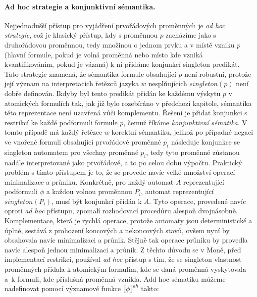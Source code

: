 \paragraph{Ad hoc strategie a konjunktivní sémantika.} Nejjednodušší přístup pro vyjádření prvořádových proměnných je \textit{ad hoc strategie}, což je klasický přístup, kdy s proměnnou $p$ zacházíme jako s druhořádovou proměnnou, tedy množinou o jednom prvku a v místě vzniku $p$ (hlavní formule, pokud je volná proměnná nebo místo kde vzniká kvantifikováním, pokud je vázaná) k ní přidáme konjunkcí singleton predikát. Tato strategie znamená, že sémantika formule obsahující $p$ není robustní, protože její význam na interpretacích řetězců jazyka $w$ nesplňujících $singleton(p)$ není dobře definován. Ikdyby byl tento predikát přidán ke každému výskytu $p$ v atomických formulích tak, jak již bylo rozebíráno v předchozí kapitole, sémantika této reprezentace není uzavřená vůči komplementu. Řešení je přidat konjunkci s restrikcí ke každé podformuli formule $p$, čemuž říkáme \textit{konjunktivní sématika}. V tomto případě má každý řetězec $w$ korektní sémantiku, jelikož po případné negaci ve vnořené formuli obsahující prvořádové proměnné $p_i$ následuje konjunkce se singleton automatem pro všechny proměnné $p_i$, tedy tyto proměnné zůstanou nadále interpretované jako prvořádové, a to po celou dobu výpočtu. Praktický problém s tímto přístupem je to, že se provede navíc velké množství operací minimalizace a průniku. Konkrétně, pro každý automat $A$ reprezentující podformuli $\phi$ a každou volnou proměnnou $P_i$, automat reprezentující $singleton(P_i)$, musí být konjunkcí přidán k $A$. Tyto operace, provedené navíc oproti \textit{ad hoc} přístupu, zpomalí rozhodovací procedůru alespoň dvojnásobně. Komplementace, která je rychlá operace, protože automaty jsou deterministické a úplné, sestává z prohození koncových a nekoncových stavů, ovšem nyní by obsahovala navíc minimalizaci a průnik. Stějně tak operace průniku by provedla navíc alespoň jednou minimalizaci a průnik. Z těchto důvodu se v Moně, před implementací restrikcí, používal \textit{ad hoc} přístup s tím, že se singleton vlastnost proměnných přidala k atomickým formulím, kde se daná proměnná vyskytovala a~k formuli, kde příslušná proměnná vznikla. Add hoc sématiku můžeme nadefinovat pomocí významové funkce $ \llbracket \phi \rrbracket^{ah} $ takto:

